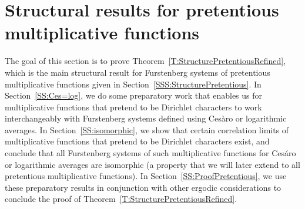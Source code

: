 \documentclass[11pt]{amsart}
\theoremstyle{definition}
\begin{document}
	\section{Structural results for  pretentious multiplicative functions}\label{S:StructurePretentious}
The goal of this section is to prove Theorem~\ref{T:StructurePretentiousRefined}, which is the main structural result for Furstenberg systems of pretentious multiplicative functions given in Section~\ref{SSS:StructurePretentious}.
In Section~\ref{SS:Ces=log}, we do some preparatory work that enables us for  multiplicative functions that pretend to be Dirichlet characters to work interchangeably with Furstenberg systems defined using   Ces\`aro or logarithmic averages. In Section~\ref{SS:isomorphic}, we show that certain correlation limits of  multiplicative functions that pretend to be Dirichlet characters exist, and conclude that all Furstenberg systems of such multiplicative functions for Ces\'aro or logarithmic averages  are isomorphic (a property that we will later extend   to all pretentious multiplicative functions). In Section~\ref{SS:ProofPretentious}, we use these preparatory results in conjunction with other ergodic considerations to conclude the proof of Theorem~\ref{T:StructurePretentiousRefined}.
\end{document}
